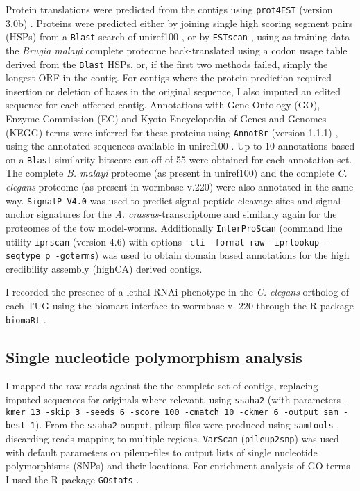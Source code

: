 Protein translations were predicted from the contigs using
\texttt{prot4EST} (version 3.0b)
\cite{wasmuth_prot4est:_2004}. Proteins were predicted either by
joining single high scoring segment pairs (HSPs) from a \texttt{Blast}
search of uniref100 \cite{pmid18836194}, or by \texttt{ESTscan}
\cite{estscan}, using as training data the \textit{Brugia malayi}
complete proteome back-translated using a codon usage table derived
from the \texttt{Blast} HSPs, or, if the first two methods failed,
simply the longest ORF in the contig. For contigs where the protein
prediction required insertion or deletion of bases in the original
sequence, I also imputed an edited sequence for each affected
contig. Annotations with Gene Ontology (GO), Enzyme Commission (EC)
and Kyoto Encyclopedia of Genes and Genomes (KEGG) terms were inferred
for these proteins using \texttt{Annot8r} (version 1.1.1)
\cite{schmid_annot8r:_2008}, using the annotated sequences available
in uniref100 \cite{pmid18836194}. Up to 10 annotations based on a
\texttt{Blast} similarity bitscore cut-off of 55 were obtained for
each annotation set. The complete \textit{B. malayi} proteome (as
present in uniref100) and the complete \textit{C. elegans} proteome
(as present in wormbase v.220) were also annotated in the same
way. \texttt{SignalP V4.0} \cite{pmid21959131} was used to predict
signal peptide cleavage sites and signal anchor signatures for the
\textit{A. crassus}-transcriptome and similarly again for the
proteomes of the tow model-worms.  Additionally \texttt{InterProScan}
\cite{pmid11590104} (command line utility \texttt{iprscan} (version
4.6) with options \texttt{-cli -format raw -iprlookup -seqtype p
  -goterms}) was used to obtain domain based annotations for the high
credibility assembly (highCA) derived contigs.

I recorded the presence of a lethal RNAi-phenotype in the
\textit{C. elegans} ortholog of each TUG using the biomart-interface
\cite{pmid22083790} to wormbase v. 220 through the R-package
\texttt{biomaRt} \cite{pmid19617889}.

\subsection{Single nucleotide polymorphism analysis}

I mapped the raw reads against the the complete set of contigs,
replacing imputed sequences for originals where relevant, using
\texttt{ssaha2} \cite{pmid11591649} (with parameters \texttt{-kmer 13
  -skip 3 -seeds 6 -score 100 -cmatch 10 -ckmer 6 -output sam -best
  1}). From the \texttt{ssaha2} output, pileup-files were produced
using \texttt{samtools} \cite{journals/bioinformatics/LiHWFRHMAD09},
discarding reads mapping to multiple regions. \texttt{VarScan}
\cite{pmid19542151} (\texttt{pileup2snp}) was used with default
parameters on pileup-files to output lists of single nucleotide
polymorphisms (SNPs) and their locations. For enrichment analysis of
GO-terms I used the R-package \texttt{GOstats} \cite{pmid17098774}.

